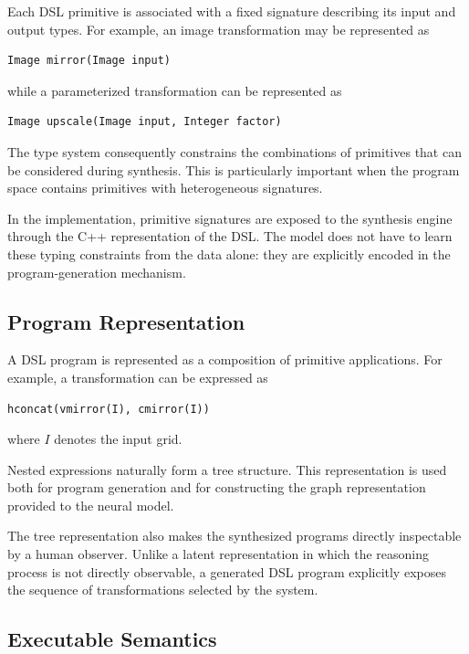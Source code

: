 \documentclass[final]{nesy2027}
\begin{document}
Each DSL primitive is associated with a fixed signature describing its input
and output types. For example, an image transformation may be represented as

\begin{verbatim}
Image mirror(Image input)
\end{verbatim}

while a parameterized transformation can be represented as

\begin{verbatim}
Image upscale(Image input, Integer factor)
\end{verbatim}

The type system consequently constrains the combinations of primitives that
can be considered during synthesis. This is particularly important when the
program space contains primitives with heterogeneous signatures.

In the implementation, primitive signatures are exposed to the synthesis
engine through the C++ representation of the DSL. The model does not have to
learn these typing constraints from the data alone: they are explicitly
encoded in the program-generation mechanism.

\subsection{Program Representation}
\label{subsec:dsl-program-representation}

A DSL program is represented as a composition of primitive applications.
For example, a transformation can be expressed as

\begin{verbatim}
hconcat(vmirror(I), cmirror(I))
\end{verbatim}

where $I$ denotes the input grid.

Nested expressions naturally form a tree structure. This representation is
used both for program generation and for constructing the graph representation
provided to the neural model.

The tree representation also makes the synthesized programs directly
inspectable by a human observer. Unlike a latent representation in which the
reasoning process is not directly observable, a generated DSL program
explicitly exposes the sequence of transformations selected by the system.

\subsection{Executable Semantics}
\label{subsec:dsl-execution}
\end{document}
